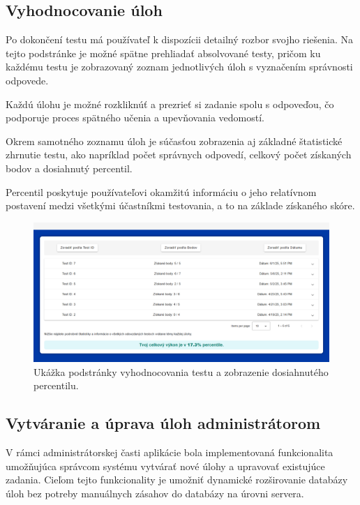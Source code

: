 \subsection{Vyhodnocovanie úloh}

Po dokončení testu má používateľ k dispozícii detailný rozbor svojho riešenia. 
Na tejto podstránke je možné spätne prehliadať absolvované testy, pričom ku každému testu je zobrazovaný zoznam jednotlivých úloh s vyznačením správnosti odpovede.

 Každú úlohu je možné rozkliknúť a prezrieť si zadanie spolu s odpoveďou, čo podporuje proces spätného učenia a upevňovania vedomostí.

Okrem samotného zoznamu úloh je súčasťou zobrazenia aj základné štatistické zhrnutie testu, ako napríklad počet správnych odpovedí, celkový počet získaných bodov a dosiahnutý percentil.

Percentil poskytuje používateľovi okamžitú informáciu o jeho relatívnom postavení medzi všetkými účastníkmi testovania, a to na základe získaného skóre.


\begin{figure}[H]
  \centering
  \includegraphics[width=14cm]{img/test-results.png}
  \caption{Ukážka podstránky vyhodnocovania testu a zobrazenie dosiahnutého percentilu.}
  \label{test-results}
\end{figure}



\subsection{Vytváranie a úprava úloh administrátorom}

V rámci administrátorskej časti aplikácie bola implementovaná funkcionalita umožňujúca správcom systému vytvárať nové úlohy a upravovať existujúce zadania.
 Cieľom tejto funkcionality je umožniť dynamické rozširovanie databázy úloh bez potreby manuálnych zásahov do databázy na úrovni servera.

